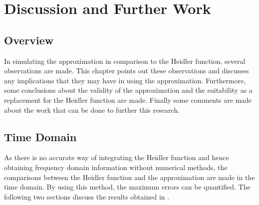 
\chapter{Discussion and Further Work} %

\label{ChapterDiscussion} %


\begin{quote}
\end{quote}


\section{Overview}
\label{sec:discussion_overview}
In simulating the approximation in comparison to the Heidler function, several observations are made. This chapter points out these observations and discusses any implications that they may have in using the approximation. Furthermore, some conclusions about the validity of the approximation and the suitability as a replacement for the Heidler function are made. Finally some comments are made about the work that can be done to further this research.


\section{Time Domain}
\label{sec:discussion_time_domain}
As there is no accurate way of integrating the Heidler function and hence obtaining frequency domain information without numerical methods, the comparisons between the Heidler function and the approximation are made in the time domain. By using this method, the maximum errors can be quantified. The following two sections discuss the results obtained in .

